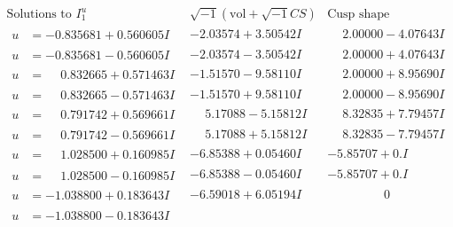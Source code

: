 \documentclass[1p]{elsarticle_modified}
\theoremstyle{definition}
\newcommand{\I}{\sqrt{-1}}
\begin{document}
$$\begin{array}{c|c|c}  
\text{Solutions to }I^u_{1}& \I (\text{vol} + \sqrt{-1}CS) & \text{Cusp shape}\\
 \hline 
\begin{aligned}
u &= -0.835681 + 0.560605 I\end{aligned}
 & -2.03574 + 3.50542 I & \phantom{-}2.00000 - 4.07643 I \\ \hline\begin{aligned}
u &= -0.835681 - 0.560605 I\end{aligned}
 & -2.03574 - 3.50542 I & \phantom{-}2.00000 + 4.07643 I \\ \hline\begin{aligned}
u &= \phantom{-}0.832665 + 0.571463 I\end{aligned}
 & -1.51570 - 9.58110 I & \phantom{-}2.00000 + 8.95690 I \\ \hline\begin{aligned}
u &= \phantom{-}0.832665 - 0.571463 I\end{aligned}
 & -1.51570 + 9.58110 I & \phantom{-}2.00000 - 8.95690 I \\ \hline\begin{aligned}
u &= \phantom{-}0.791742 + 0.569661 I\end{aligned}
 & \phantom{-}5.17088 - 5.15812 I & \phantom{-}8.32835 + 7.79457 I \\ \hline\begin{aligned}
u &= \phantom{-}0.791742 - 0.569661 I\end{aligned}
 & \phantom{-}5.17088 + 5.15812 I & \phantom{-}8.32835 - 7.79457 I \\ \hline\begin{aligned}
u &= \phantom{-}1.028500 + 0.160985 I\end{aligned}
 & -6.85388 + 0.05460 I & -5.85707 + 0. I\phantom{ +0.000000I} \\ \hline\begin{aligned}
u &= \phantom{-}1.028500 - 0.160985 I\end{aligned}
 & -6.85388 - 0.05460 I & -5.85707 + 0. I\phantom{ +0.000000I} \\ \hline\begin{aligned}
u &= -1.038800 + 0.183643 I\end{aligned}
 & -6.59018 + 6.05194 I & \phantom{-0.000000 } 0 \\ \hline\begin{aligned}
u &= -1.038800 - 0.183643 I\end{aligned}

\end{array}$$
\end{document}
